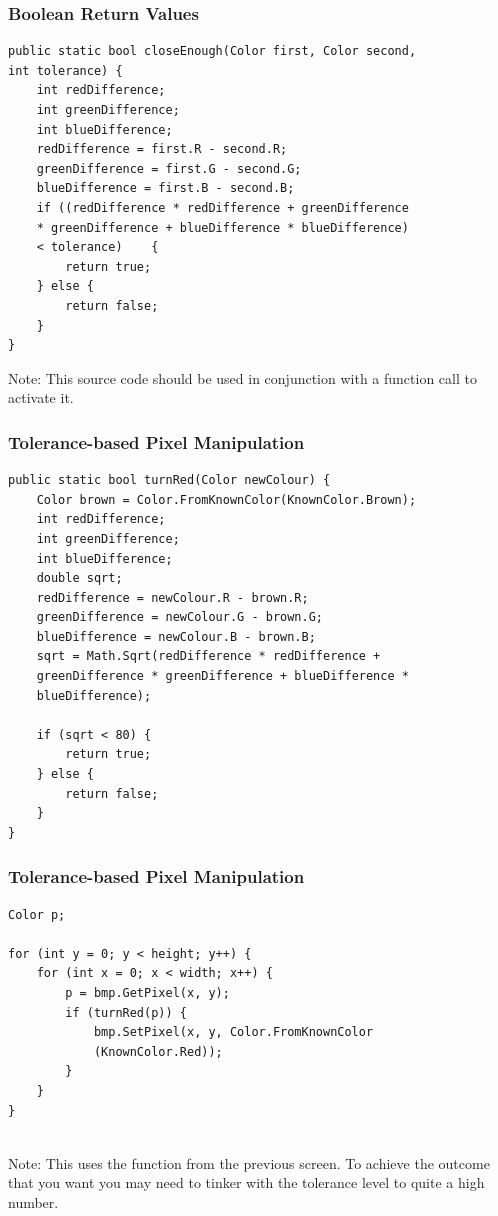 \begin{frame}[fragile]
	\frametitle{Boolean Return Values}
	
\begin{lstlisting}
public static bool closeEnough(Color first, Color second,
int tolerance) {
	int redDifference;
	int greenDifference;
	int blueDifference;
	redDifference = first.R - second.R;
	greenDifference = first.G - second.G;
	blueDifference = first.B - second.B;	
	if ((redDifference * redDifference + greenDifference
	* greenDifference + blueDifference * blueDifference)
	< tolerance)	{
		return true;
	} else {
		return false;
	}
}
\end{lstlisting}

Note: This source code should be used in conjunction with a function call to activate it.

\end{frame}

\begin{frame}[fragile]
	\frametitle{Tolerance-based Pixel Manipulation}
	
\begin{lstlisting}
public static bool turnRed(Color newColour) {
	Color brown = Color.FromKnownColor(KnownColor.Brown);
	int redDifference;
	int greenDifference;
	int blueDifference;
	double sqrt;
	redDifference = newColour.R - brown.R;
	greenDifference = newColour.G - brown.G;
	blueDifference = newColour.B - brown.B;
	sqrt = Math.Sqrt(redDifference * redDifference + 
	greenDifference * greenDifference + blueDifference * 
	blueDifference);
	
	if (sqrt < 80) {
		return true;
	} else {
		return false;
	}	
}

\end{lstlisting}


\end{frame}

\begin{frame}[fragile]
	\frametitle{Tolerance-based Pixel Manipulation}
	
	\begin{lstlisting}
Color p;

for (int y = 0; y < height; y++) {
	for (int x = 0; x < width; x++) {
		p = bmp.GetPixel(x, y);
		if (turnRed(p))	{
			bmp.SetPixel(x, y, Color.FromKnownColor
			(KnownColor.Red));
		}
	}
}
		
	\end{lstlisting}
Note: This uses the function from the previous screen. To achieve the outcome that you want you may need to tinker with the tolerance level to quite a high number.	
	
\end{frame}
		

